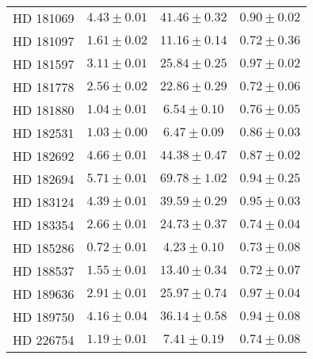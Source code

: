 \begin{table}
\begin{tabular}{cccc}
HD 181069 & $4.43 \pm 0.01$ & $41.46 \pm 0.32$ & $0.90 \pm 0.02$ \\
HD 181097 & $1.61 \pm 0.02$ & $11.16 \pm 0.14$ & $0.72 \pm 0.36$ \\
HD 181597 & $3.11 \pm 0.01$ & $25.84 \pm 0.25$ & $0.97 \pm 0.02$ \\
HD 181778 & $2.56 \pm 0.02$ & $22.86 \pm 0.29$ & $0.72 \pm 0.06$ \\
HD 181880 & $1.04 \pm 0.01$ & $6.54 \pm 0.10$ & $0.76 \pm 0.05$ \\
HD 182531 & $1.03 \pm 0.00$ & $6.47 \pm 0.09$ & $0.86 \pm 0.03$ \\
HD 182692 & $4.66 \pm 0.01$ & $44.38 \pm 0.47$ & $0.87 \pm 0.02$ \\
HD 182694 & $5.71 \pm 0.01$ & $69.78 \pm 1.02$ & $0.94 \pm 0.25$ \\
HD 183124 & $4.39 \pm 0.01$ & $39.59 \pm 0.29$ & $0.95 \pm 0.03$ \\
HD 183354 & $2.66 \pm 0.01$ & $24.73 \pm 0.37$ & $0.74 \pm 0.04$ \\
HD 185286 & $0.72 \pm 0.01$ & $4.23 \pm 0.10$ & $0.73 \pm 0.08$ \\
HD 188537 & $1.55 \pm 0.01$ & $13.40 \pm 0.34$ & $0.72 \pm 0.07$ \\
HD 189636 & $2.91 \pm 0.01$ & $25.97 \pm 0.74$ & $0.97 \pm 0.04$ \\
HD 189750 & $4.16 \pm 0.04$ & $36.14 \pm 0.58$ & $0.94 \pm 0.08$ \\
HD 226754 & $1.19 \pm 0.01$ & $7.41 \pm 0.19$ & $0.74 \pm 0.08$ \\
\hline
\end{tabular}
\end{table}
